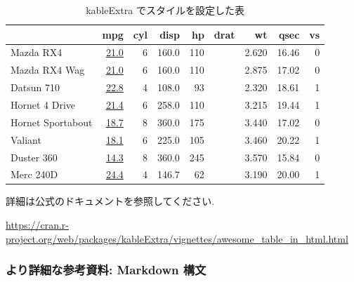 \documentclass[
]{ltjsarticle}
\begin{document}
\begin{table}

\caption{\label{tab:table-example2}kableExtra でスタイルを設定した表}
\centering
\begin{tabular}[t]{l>{}rrrr>{}rrrr}
\toprule
  & mpg & cyl & disp & hp & drat & wt & qsec & vs\\
\midrule
Mazda RX4 & \href{https://haozhu233.github.io/kableExtra/}{\textcolor[HTML]{34B679}{21.0}} & 6 & 160.0 & 110 & \cellcolor[HTML]{43BF71}{\textcolor{white}{3.90}} & 2.620 & 16.46 & 0\\
Mazda RX4 Wag & \href{https://haozhu233.github.io/kableExtra/}{\textcolor[HTML]{34B679}{21.0}} & 6 & 160.0 & 110 & \cellcolor[HTML]{43BF71}{\textcolor{white}{3.90}} & 2.875 & 17.02 & 0\\
Datsun 710 & \href{https://haozhu233.github.io/kableExtra/}{\textcolor[HTML]{95D840}{22.8}} & 4 & 108.0 & 93 & \cellcolor[HTML]{37B878}{\textcolor{white}{3.85}} & 2.320 & 18.61 & 1\\
Hornet 4 Drive & \href{https://haozhu233.github.io/kableExtra/}{\textcolor[HTML]{44BF70}{21.4}} & 6 & 258.0 & 110 & \cellcolor[HTML]{414387}{\textcolor{white}{3.08}} & 3.215 & 19.44 & 1\\
Hornet Sportabout & \href{https://haozhu233.github.io/kableExtra/}{\textcolor[HTML]{26818E}{18.7}} & 8 & 360.0 & 175 & \cellcolor[HTML]{3C4F8A}{\textcolor{white}{3.15}} & 3.440 & 17.02 & 0\\
\addlinespace
Valiant & \href{https://haozhu233.github.io/kableExtra/}{\textcolor[HTML]{2C728E}{18.1}} & 6 & 225.0 & 105 & \cellcolor[HTML]{440154}{\textcolor{white}{2.76}} & 3.460 & 20.22 & 1\\
Duster 360 & \href{https://haozhu233.github.io/kableExtra/}{\textcolor[HTML]{440154}{14.3}} & 8 & 360.0 & 245 & \cellcolor[HTML]{375A8C}{\textcolor{white}{3.21}} & 3.570 & 15.84 & 0\\
Merc 240D & \href{https://haozhu233.github.io/kableExtra/}{\textcolor[HTML]{FDE725}{24.4}} & 4 & 146.7 & 62 & \cellcolor[HTML]{1FA187}{\textcolor{white}{3.69}} & 3.190 & 20.00 & 1\\
\bottomrule
\end{tabular}
\end{table}

詳細は公式のドキュメントを参照してください.

\url{https://cran.r-project.org/web/packages/kableExtra/vignettes/awesome_table_in_html.html}

\hypertarget{ux3088ux308aux8a73ux7d30ux306aux53c2ux8003ux8cc7ux6599-markdown-ux69cbux6587}{%
\subsubsection{より詳細な参考資料: Markdown 構文}\label{ux3088ux308aux8a73ux7d30ux306aux53c2ux8003ux8cc7ux6599-markdown-ux69cbux6587}}
\end{document}
